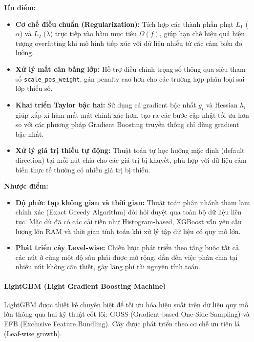 \textbf{Ưu điểm:}
\begin{itemize}
    \item \textbf{Cơ chế điều chuẩn (Regularization):} Tích hợp các thành phần phạt $L_1$ ($\alpha$) và $L_2$ ($\lambda$) trực tiếp vào hàm mục tiêu $\Omega(f)$, giúp hạn chế hiệu quả hiện tượng overfitting khi mô hình tiếp xúc với dữ liệu nhiễu từ các cảm biến đo lường.
    \item \textbf{Xử lý mất cân bằng lớp:} Hỗ trợ điều chỉnh trọng số thông qua siêu tham số \texttt{scale\_pos\_weight}, gán penalty cao hơn cho các trường hợp phân loại sai lớp thiểu số.
    \item \textbf{Khai triển Taylor bậc hai:} Sử dụng cả gradient bậc nhất $g_i$ và Hessian $h_i$ giúp xấp xỉ hàm mất mát chính xác hơn, tạo ra các bước cập nhật tối ưu hơn so với các phương pháp Gradient Boosting truyền thống chỉ dùng gradient bậc nhất.
    \item \textbf{Xử lý giá trị thiếu tự động:} Thuật toán tự học hướng mặc định (default direction) tại mỗi nút chia cho các giá trị bị khuyết, phù hợp với dữ liệu cảm biến thực tế thường có nhiều giá trị bị thiếu.
\end{itemize}

\textbf{Nhược điểm:}
\begin{itemize}
    \item \textbf{Độ phức tạp không gian và thời gian:} Thuật toán phân nhánh tham lam chính xác (Exact Greedy Algorithm) đòi hỏi duyệt qua toàn bộ dữ liệu liên tục. Mặc dù đã có các cải tiến như Histogram-based, XGBoost vẫn yêu cầu lượng lớn RAM và thời gian tính toán khi xử lý tập dữ liệu có quy mô lớn.
    \item \textbf{Phát triển cây Level-wise:} Chiến lược phát triển theo tầng buộc tất cả các nút ở cùng một độ sâu phải được mở rộng, dẫn đến việc phân chia tại nhiều nút không cần thiết, gây lãng phí tài nguyên tính toán.
\end{itemize}

\paragraph{LightGBM (Light Gradient Boosting Machine)}\hspace{1cm}

LightGBM được thiết kế chuyên biệt để tối ưu hóa hiệu suất trên dữ liệu quy mô lớn thông qua hai kỹ thuật cốt lõi: GOSS (Gradient-based One-Side Sampling) và EFB (Exclusive Feature Bundling). Cây được phát triển theo cơ chế ưu tiên lá (Leaf-wise growth).

